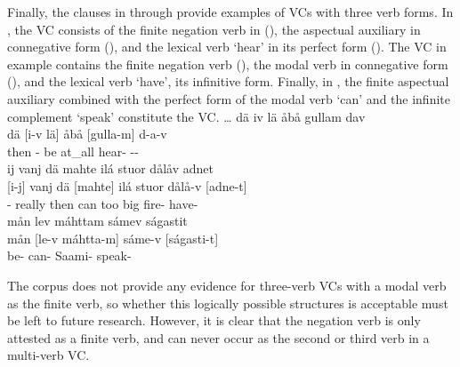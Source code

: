 Finally, the clauses in  through  provide examples of VCs with three verb forms. In , the VC consists of the finite negation verb in  (), the aspectual auxiliary  in connegative form (), and the lexical verb  ‘hear’ in its perfect form (). The VC in example  contains the finite negation verb  (), the modal verb  in connegative form (), and the lexical verb  ‘have’, its infinitive form. Finally, in , the finite aspectual auxiliary  combined with the perfect form of the modal verb  ‘can’ and the infinite complement  ‘speak’ constitute the VC.
\ea\label{VCex6}
\glll	… dä iv lä åbå gullam dav\\
	{} dä [i-v {lä]\subVC} åbå {[gulla-m]\subVC} d-a-v\\
	{} then - be\BS{} at\_all hear- --\\\nopagebreak
{}	
\z
\ea\label{VCex7}
\glll	ij vanj dä mahte ilá stuor dålåv adnet\\
	{[i-j]\subVC} vanj dä {[mahte]\subVC} ilá stuor dålå-v {[adne-t]\subVC}\\
	- really then can\BS{} too big fire- have-\\\nopagebreak
{}	
\z
\ea\label{VCex8}
\glll	mån lev máhttam sámev ságastit\\
	mån {[le-v} {máhtta-m]\subVC} sáme-v {[ságasti-t]\subVC}\\
	 be- can- Saami- speak-\\\nopagebreak
{}	
\z


The corpus does not provide any evidence for three-verb VCs with a modal verb as the finite verb, so whether this logically possible structures is acceptable 
must be left to future research. However, it is clear that the negation verb is only attested as a finite verb, and can never occur as the second or third verb in a multi-verb VC. 




